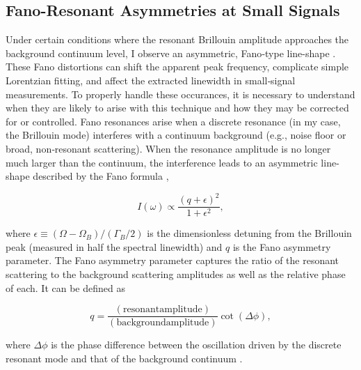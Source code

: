 \FloatBarrier

\subsection{Fano-Resonant Asymmetries at Small Signals}
\label{Results:Fano-Resonant Asymmetries at Small Signals}

Under certain conditions where the resonant Brillouin amplitude approaches the background continuum level, I observe an asymmetric, Fano‐type line-shape \cite{fano1961effects, limonov2017fano, limonov2021fano, kroner2008nonlinear}. These Fano distortions can shift the apparent peak frequency, complicate simple Lorentzian fitting, and affect the extracted linewidth in small‐signal measurements. \cite{miroshnichenko2010fano} To properly handle these occurances, it is necessary to understand when they are likely to arise with this technique and how they may be corrected for or controlled. Fano resonances arise when a discrete resonance (in my case, the Brillouin mode) interferes with a continuum background (e.g., noise floor or broad, non‐resonant scattering). When the resonance amplitude is no longer much larger than the continuum, the interference leads to an asymmetric line-shape described by the Fano formula \cite{fano1961effects},

\begin{equation}
I(\omega) \propto \frac{(q + \epsilon)^2}{1 + \epsilon^2},
\label{eq:fano}
\end{equation}

where \(\epsilon \equiv (\Omega - \Omega_{B})/(\Gamma_{B}/2)\) is the dimensionless detuning from the Brillouin peak (measured in half the spectral linewidth) and \(q\) is the Fano asymmetry parameter. The Fano asymmetry parameter captures the ratio of the resonant scattering to the background scattering amplitudes as well as the relative phase of each. It can be defined as

\begin{equation}
  q = \frac{(\mathrm{resonant amplitude})}{(\mathrm{background amplitude})}\cot{(\Delta\phi)},
\end{equation}

where \(\Delta\phi\) is the phase difference between the oscillation driven by the discrete resonant mode and that of the background continuum \cite{limonov2017fano, ko2023full, gu2020fano}.

